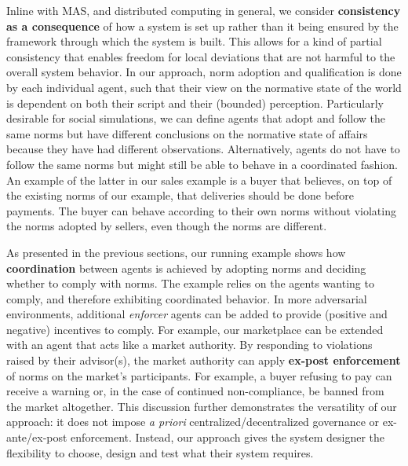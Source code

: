 Inline with MAS, and distributed computing in general, we consider \textbf{consistency as a consequence} of how a system is set up rather than it being ensured by the framework through which the system is built.
%
This allows for a kind of partial consistency that enables freedom for local deviations that are not harmful to the overall system behavior.
%
In our approach, norm adoption and qualification is done by each individual agent, such that their view on the normative state of the world is dependent on both their script and their (bounded) perception.
%
Particularly desirable for social simulations, we can define agents that adopt and follow the same norms but have different conclusions on the normative state of affairs because they have had different observations.
%
Alternatively, agents do not have to follow the same norms but might still be able to behave in a coordinated fashion.
%
An example of the latter in our sales example is a buyer that believes, on top of the existing norms of our example, that deliveries should be done before payments.
%
The buyer can behave according to their own norms without violating the norms adopted by sellers, even though the norms are different.
%

As presented in the previous sections, our running example shows how \textbf{coordination} between agents is achieved by adopting norms and deciding whether to comply with norms. 
%
The example relies on the agents wanting to comply, and therefore exhibiting coordinated behavior.
%
In more adversarial environments, additional \textit{enforcer} agents can be added to provide (positive and negative) incentives to comply.
%
For example, our marketplace can be extended with an agent that acts like a market authority.
%
%
By responding to violations raised by their advisor(s), the market authority can apply \textbf{ex-post enforcement} of norms on the market's participants.
%
For example, a buyer refusing to pay can receive a warning or, in the case of continued non-compliance, be banned from the market altogether.
%
This discussion further demonstrates the versatility of our approach: it does not impose \textit{a priori} centralized/decentralized governance or ex-ante/ex-post enforcement. 
%
Instead, our approach gives the system designer the flexibility to choose, design and test what their system requires.


